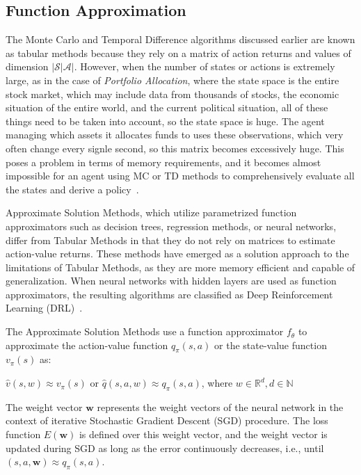 \documentclass[../xlapes02]{subfiles}
\begin{document}
    \subsection{Function Approximation}\label{subsec:function-approximation}
    The Monte Carlo and Temporal Difference algorithms discussed earlier are known as tabular methods because they rely on a matrix of action returns and values of dimension $|\mathcal{S}|\mathcal{A}|$. However, when the number of states or actions is extremely large, as in the case of \emph{Portfolio Allocation}, where the state space is the entire stock market, which may include data from thousands of stocks, the economic situation of the entire world, and the current political situation, all of these things need to be taken into account, so the state space is huge. The agent managing which assets it allocates funds to uses these observations, which very often change every signle second, so this matrix becomes excessively huge. This poses a problem in terms of memory requirements, and it becomes almost impossible for an agent using MC or TD methods to comprehensively evaluate all the states and derive a policy~\cite{sutton2018reinforcement}.

    Approximate Solution Methods, which utilize parametrized function approximators such as decision trees, regression methods, or neural networks, differ from Tabular Methods in that they do not rely on matrices to estimate action-value returns. These methods have emerged as a solution approach to the limitations of Tabular Methods, as they are more memory efficient and capable of generalization. When neural networks with hidden layers are used as function approximators, the resulting algorithms are classified as Deep Reinforcement Learning (DRL)~\cite{FITMT25127}.

    The Approximate Solution Methods use a function approximator \(f_\theta\) to approximate the action-value function \(q_\pi(s,a)\) or the state-value function \(v_\pi(s)\) as:

    \(\hat{v}(s,w) \approx v_{\pi}(s)\) or \(\hat{q}(s,a,w) \approx q_{\pi}(s,a)\), where \(w \in \mathbb{R}^d, d \in \mathbb{N}\)

    The weight vector $\mathbf{w}$ represents the weight vectors of the neural network in the context of iterative Stochastic Gradient Descent (SGD) procedure. The loss function $E(\mathbf{w})$ is defined over this weight vector, and the weight vector is updated during SGD as long as the error continuously decreases, i.e., until $(s, a, \mathbf{w}) \approx q_{\pi}(s, a)$.
\end{document}
